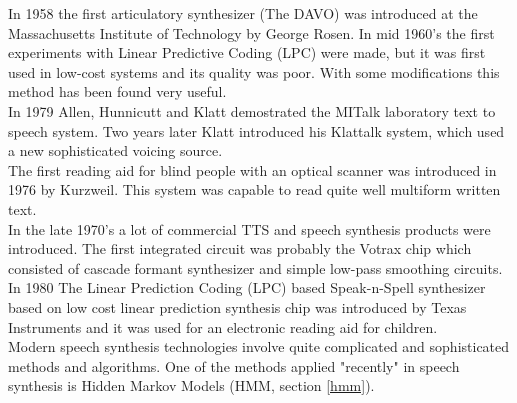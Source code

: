 In 1958 the first articulatory synthesizer (The DAVO) was introduced at the Massachusetts Institute of Technology by George Rosen. In mid 1960's the first experiments with Linear Predictive Coding (LPC) were made, but it was first used in low-cost systems and its quality was poor. With some modifications this method has been found very useful.\\
In 1979 Allen, Hunnicutt and Klatt demostrated the MITalk laboratory text to speech system. Two years later Klatt introduced his Klattalk system, which used a new sophisticated voicing source.\\
The first reading aid for blind people with an optical scanner was introduced in 1976 by Kurzweil. This system was capable to read quite well multiform written text.\\
In the late 1970's a lot of commercial TTS and speech synthesis products were introduced. The first integrated circuit was probably the Votrax chip which consisted of cascade formant synthesizer and simple low-pass smoothing circuits. In 1980 The Linear Prediction Coding (LPC) based Speak-n-Spell synthesizer based on low cost linear prediction synthesis chip was introduced by Texas Instruments and it was used for an electronic reading aid for children.\\
Modern speech synthesis technologies involve quite complicated and sophisticated methods and algorithms. One of the methods applied "recently" in speech synthesis is Hidden Markov Models (HMM, section \ref{hmm}).

